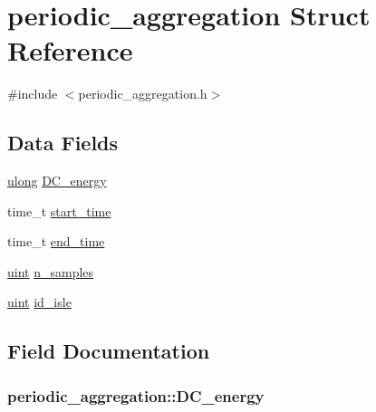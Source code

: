 \hypertarget{structperiodic__aggregation}{}\section{periodic\+\_\+aggregation Struct Reference}
\label{structperiodic__aggregation}


{\ttfamily \#include $<$periodic\+\_\+aggregation.\+h$>$}

\subsection*{Data Fields}
\begin{DoxyCompactItemize}
\item 
\hyperlink{generic_8h_a718b4eb2652c286f4d42dc18a8e71a1a}{ulong} \hyperlink{structperiodic__aggregation_a7ae35fc09c62f09ec2d03e1f74eec36b}{D\+C\+\_\+energy}
\item 
time\+\_\+t \hyperlink{structperiodic__aggregation_a4818076c7544f5a45368e33bcfc50d73}{start\+\_\+time}
\item 
time\+\_\+t \hyperlink{structperiodic__aggregation_acb2fde54d57fd50bb87dce20920bd1eb}{end\+\_\+time}
\item 
\hyperlink{generic_8h_a91ad9478d81a7aaf2593e8d9c3d06a14}{uint} \hyperlink{structperiodic__aggregation_a2048b14063a67f92b18cdcf4ed10030d}{n\+\_\+samples}
\item 
\hyperlink{generic_8h_a91ad9478d81a7aaf2593e8d9c3d06a14}{uint} \hyperlink{structperiodic__aggregation_a03a3a3e84da52909ea2f545a4e735d4c}{id\+\_\+isle}
\end{DoxyCompactItemize}


\subsection{Field Documentation}
\subsubsection[{\texorpdfstring{D\+C\+\_\+energy}{DC_energy}}]{ periodic\+\_\+aggregation\+::\+D\+C\+\_\+energy}\hypertarget{structperiodic__aggregation_a7ae35fc09c62f09ec2d03e1f74eec36b}{}\label{structperiodic__aggregation_a7ae35fc09c62f09ec2d03e1f74eec36b}
